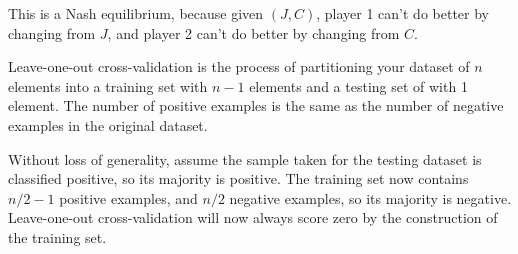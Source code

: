 \documentclass[12pt]{article}
\begin{document}
This is a Nash equilibrium, because given $(J,C)$, player 1 can't do better by changing from $J$, and player 2 can't do
better by changing from $C$.


\newpage
\problem

Leave-one-out cross-validation is the process of partitioning your dataset of $n$ elements into a training set with
$n-1$ elements and a testing set of with 1 element. The number of positive examples is the same as the number
of negative examples in the original dataset.

Without loss of generality, assume the sample taken for the testing dataset is classified positive, so its majority is
positive. The training set now contains $n/2 - 1$ positive examples, and $n/2$ negative examples, so its majority is
negative. Leave-one-out cross-validation will now always score zero by the construction of the training set.

\problemsub

\problemsub

\problemsub

\problemsub

\problemsub

\problemsub

\problemsub

\problemsub

\problemsub

\problemsub

\problemsub
\end{document}
